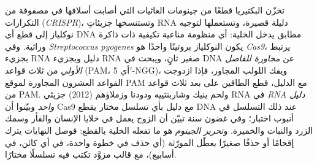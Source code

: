 \begin{definition}\label{def:b3:genetic-engineering:crispr}
تخزّن البكتيريا قطعًا من جينومات العاثيات التي أصابت
أسلافها في مصفوفة من التكرارات (\emph{CRISPR})، وتستنسخها
جزيئاتِ RNA دليلة قصيرة، وتستعملها لتوجيه نوكلياز إلى قطع أي
DNA مطابق يدخل الخلية: أي منظومة مناعية تكيفية ذات
ذاكرة وراثية. وفي \emph{Streptococcus pyogenes} يكون النوكلياز
بروتينًا واحدًا هو \emph{Cas9}، يرتبط بجزيء RNA دليل وبجزيء RNA صغير
ثانٍ، ويبحث في DNA عن \emph{ مجاورة للفاصل الأولي}
من ثلاث قواعد (PAM، أي 5$'$-NGG)، ويفك اللولب المجاور، فإذا ازدوجت
القواعد العشرون المجاورة لموقع PAM مع الدليل، قطع الطاقين على بعد ثلاث قواعد من
PAM. ولحم ينيك وشاربنتييه ودودنا وزملاؤهم (2012) جزيئي
RNA في \emph{RNA دليل واحد} وبيّنوا أن Cas9 مع دليل
بأي تسلسل مختار يقطع DNA عند ذلك التسلسل في أنبوب اختبار؛ وفي
غضون سنة تبيّن أن الزوج يعمل في خلايا الإنسان والفأر وسمك الزرد
والنبات والخميرة. و\emph{تحرير الجينوم} هو ما تفعله الخلية
بالقطع: فوصل النهايات يترك إقحامًا أو حذفًا صغيرًا
يعطّل المورّثة (أي حذف في خطوة واحدة، في أي كائن، في أسابيع)،
 مع قالب مزوَّد تكتب فيه
تسلسلًا مختارًا.
\end{definition}

